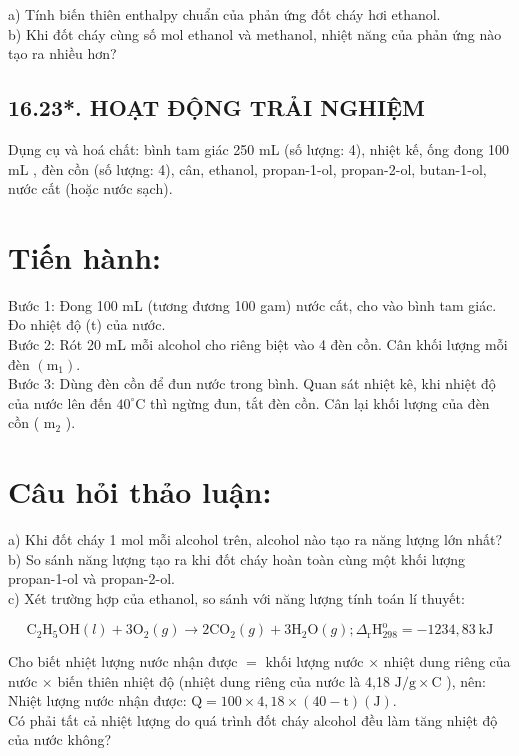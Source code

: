 \documentclass[10pt]{article}
\begin{document}
a) Tính biến thiên enthalpy chuẩn của phản ứng đốt cháy hơi ethanol.\\
b) Khi đốt cháy cùng số mol ethanol và methanol, nhiệt năng của phản ứng nào tạo ra nhiều hơn?

\subsection*{16.23*. HOẠT ĐỘNG TRẢI NGHIỆM}
Dụng cụ và hoá chất: bình tam giác 250 mL (số lượng: 4), nhiệt kế, ống đong 100 mL , đèn cồn (số lượng: 4), cân, ethanol, propan-1-ol, propan-2-ol, butan-1-ol, nước cất (hoặc nước sạch).

\section*{Tiến hành:}
Bước 1: Đong 100 mL (tương đương 100 gam) nước cất, cho vào bình tam giác. Đo nhiệt độ (t) của nước.\\
Bước 2: Rót 20 mL mỗi alcohol cho riêng biệt vào 4 đèn cồn. Cân khối lượng mỗi đèn $\left(\mathrm{m}_{1}\right)$.\\
Bước 3: Dùng đèn cồn để đun nước trong bình. Quan sát nhiệt kê, khi nhiệt độ của nước lên đến $40^{\circ} \mathrm{C}$ thì ngừng đun, tắt đèn cồn. Cân lại khối lượng của đèn cồn ( $\mathrm{m}_{2}$ ).

\section*{Câu hỏi thảo luận:}
a) Khi đốt cháy 1 mol mỗi alcohol trên, alcohol nào tạo ra năng lượng lớn nhất?\\
b) So sánh năng lượng tạo ra khi đốt cháy hoàn toàn cùng một khối lượng propan-1-ol và propan-2-ol.\\
c) Xét trường hợp của ethanol, so sánh với năng lượng tính toán lí thuyết:

$$
\mathrm{C}_{2} \mathrm{H}_{5} \mathrm{OH}(l)+3 \mathrm{O}_{2}(g) \rightarrow 2 \mathrm{CO}_{2}(g)+3 \mathrm{H}_{2} \mathrm{O}(g) ; \Delta_{\mathrm{r}} \mathrm{H}_{298}^{\mathrm{o}}=-1234,83 \mathrm{~kJ}
$$

Cho biết nhiệt lượng nước nhận được $=$ khối lượng nước $\times$ nhiệt dung riêng của nước $\times$ biến thiên nhiệt độ (nhiệt dung riêng của nước là 4,18 $\mathrm{J} / \mathrm{g} \times \mathrm{C}$ ), nên:\\
Nhiệt lượng nước nhận được: $\mathrm{Q}=100 \times 4,18 \times(40-\mathrm{t})(\mathrm{J})$.\\
Có phải tất cả nhiệt lượng do quá trình đốt cháy alcohol đều làm tăng nhiệt độ của nước không?
\end{document}
